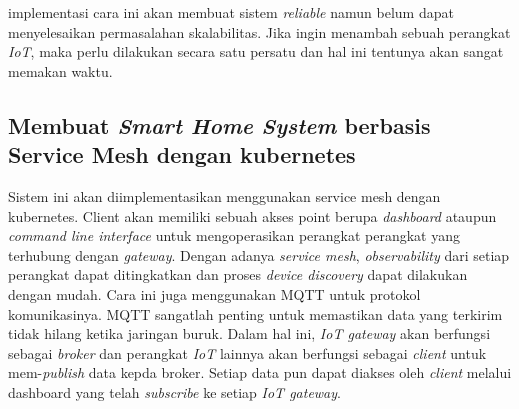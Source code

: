 implementasi cara ini akan membuat sistem \textit{reliable} namun belum dapat menyelesaikan permasalahan skalabilitas. Jika ingin menambah sebuah perangkat \textit{IoT}, maka perlu dilakukan secara satu persatu dan hal ini tentunya akan sangat memakan waktu.

\subsection{Membuat \textit{Smart Home System} berbasis Service Mesh dengan kubernetes}
Sistem ini akan diimplementasikan menggunakan service mesh dengan kubernetes. Client akan memiliki sebuah akses point berupa \textit{dashboard} ataupun \textit{command line interface} untuk mengoperasikan perangkat perangkat yang terhubung dengan \textit{gateway}. Dengan adanya \textit{service mesh}, \textit{observability} dari setiap perangkat dapat ditingkatkan dan proses \textit{device discovery} dapat dilakukan dengan mudah. Cara ini juga menggunakan MQTT untuk protokol komunikasinya. MQTT sangatlah penting untuk memastikan data yang terkirim tidak hilang ketika jaringan buruk. Dalam hal ini, \textit{IoT gateway} akan berfungsi sebagai \textit{broker} dan perangkat \textit{IoT} lainnya akan berfungsi sebagai \textit{client} untuk mem-\textit{publish} data kepda broker. Setiap data pun dapat diakses oleh \textit{client} melalui dashboard yang telah \textit{subscribe} ke setiap \textit{IoT gateway}.




